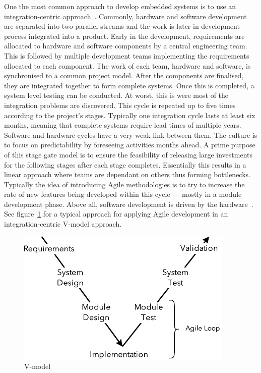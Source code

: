\documentclass[english]{tktltiki2}
\begin{document}
One the most common approach to develop embedded systems is to use an integration-centric approach~\cite{EB12, EHS14}. Commonly, hardware and software development are separated into two parallel streams and the work is later in development process integrated into a product. Early in the development, requirements are allocated to hardware and software components by a central engineering team. This is followed by multiple development teams implementing the requirements allocated to each component. The work of each team, hardware and software, is synchronised to a common project model. After the components are finalised, they are integrated together to form complete systems. Once this is completed, a system level testing can be conducted. At worst, this is were most of the integration problems are discovered. This cycle is repeated up to five times according to the project’s stages. Typically one integration cycle lasts at least six months, meaning that complete systems require lead times of multiple years. Software and hardware cycles have a very weak link between them. The culture is to focus on predictability by foreseeing activities months ahead. A prime purpose of this stage gate model is to ensure the feasibility of releasing large investments for the following stages after each stage completes. Essentially this results in a linear approach where teams are dependant on others thus forming bottlenecks. Typically the idea of introducing Agile methodologies is to try to increase the rate of new features being developed within this cycle — mostly in a module development phase. Above all, software development is driven by the hardware~\cite{EB12}. See figure~\ref{figure:v-model} for a typical approach for applying Agile development in an integration-centric V-model approach.

\begin{figure}[h!]

    \vspace{1cm}
    \centering

    \includegraphics{figures/v-model}

    \caption{V-model~\cite{EHS14}}
    \label{figure:v-model}

    \vspace{1cm}

\end{figure}
\end{document}
